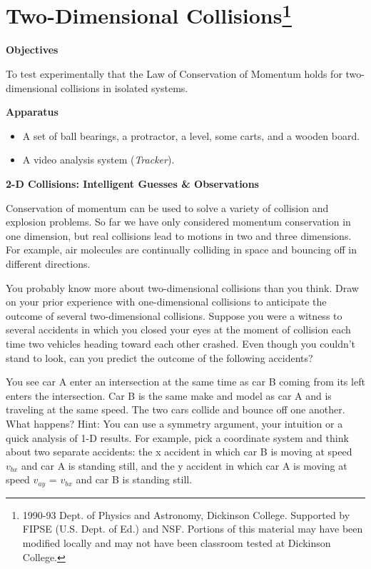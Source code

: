 
\section{Two-Dimensional Collisions\footnote{
1990-93 Dept. of Physics and Astronomy, Dickinson College. Supported by FIPSE
(U.S. Dept. of Ed.) and NSF. Portions of this material may have been modified
locally and may not have been classroom tested at Dickinson College.
}}

\makelabheader %

\bigskip
\textbf{Objectives} 

To test experimentally that the Law of Conservation of Momentum holds for two-dimensional
collisions in isolated systems.

\bigskip
\textbf{Apparatus}

\begin{itemize}
\item A set of ball bearings, a protractor, a level, some carts, 
and a wooden board.
\item A video analysis system (\textit{Tracker}).
\end{itemize}

\bigskip
\textbf{2-D Collisions: Intelligent Guesses \& Observations }

Conservation of momentum can be used to solve a variety of collision and explosion
problems. So far we have only considered momentum conservation in one dimension,
but real collisions lead to motions in two and three dimensions. For example,
air molecules are continually colliding in space and bouncing off in different
directions. 

You probably know more about two-dimensional collisions than you think. Draw
on your prior experience with one-dimensional collisions to anticipate the outcome
of several two-dimensional collisions. Suppose you were a witness to several
accidents in which you closed your eyes at the moment of collision each time
two vehicles heading toward each other crashed. Even though you couldn't stand
to look, can you predict the outcome of the following accidents?

You see car A enter an intersection at the same time as car B coming from its
left enters the intersection. Car B is the same make and model as car A and
is traveling at the same speed. The two cars collide and bounce off one another.
What happens? Hint: You can use a symmetry argument, your intuition or a quick
analysis of 1-D results. For example, pick a coordinate system and think about
two separate accidents: the x accident in which car B is moving at speed \( v_{bx} \)
and car A is standing still, and the y accident in which car A is moving at
speed \( v_{ay} \) = \( v_{bx} \) and car B is standing still. 

